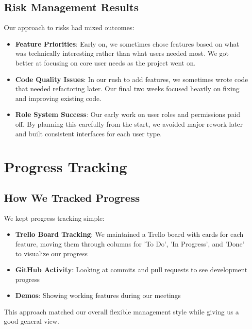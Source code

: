 \subsection{Risk Management Results}

Our approach to risks had mixed outcomes:

\begin{itemize}
    \item \textbf{Feature Priorities}: Early on, we sometimes chose features based on what was technically interesting rather than what users needed most. We got better at focusing on core user needs as the project went on.
    
    \item \textbf{Code Quality Issues}: In our rush to add features, we sometimes wrote code that needed refactoring later. Our final two weeks focused heavily on fixing and improving existing code.
    
    \item \textbf{Role System Success}: Our early work on user roles and permissions paid off. By planning this carefully from the start, we avoided major rework later and built consistent interfaces for each user type.
\end{itemize}

\section{Progress Tracking}

\subsection{How We Tracked Progress}

We kept progress tracking simple:

\begin{itemize}
    \item \textbf{Trello Board Tracking}: We maintained a Trello board with cards for each feature, moving them through columns for 'To Do', 'In Progress', and 'Done' to visualize our progress
    \item \textbf{GitHub Activity}: Looking at commits and pull requests to see development progress
    
    \item \textbf{Demos}: Showing working features during our meetings
\end{itemize}

This approach matched our overall flexible management style while giving us a good general view.

